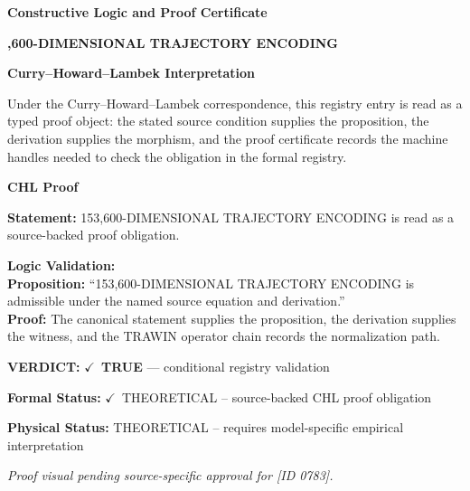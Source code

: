 \clearpage
\begingroup\tzpsupportsetup
\noindent\textbf{\fontsize{10.8pt}{12.8pt}\selectfont [ID 0783] Constructive Logic and Proof Certificate}\par
\noindent\textbf{\fontsize{10pt}{12pt},600-DIMENSIONAL TRAJECTORY ENCODING}\par
\vspace{0.45em}
\begingroup
\footnotesize
\setlength{\parskip}{0.22em}
\setlength{\parindent}{0pt}
\noindent\textbf{Curry--Howard--Lambek Interpretation}\par
Under the Curry--Howard--Lambek correspondence, this registry entry is read as a typed proof
object: the stated source condition supplies the proposition, the derivation supplies the
morphism, and the proof certificate records the machine handles needed to check the obligation
in the formal registry.

\vspace{0.45em}
\noindent\textbf{CHL Proof}\par
\textbf{Statement:} 153,600-DIMENSIONAL TRAJECTORY ENCODING is read as a source-backed proof obligation.

\textbf{Logic Validation:}\\
\textbf{Proposition:} ``153,600-DIMENSIONAL TRAJECTORY ENCODING is admissible under the named source equation and derivation.''\\
\textbf{Proof:} The canonical statement supplies the proposition, the derivation supplies the witness, and the TRAWIN operator chain records the normalization path.

\textbf{VERDICT:} \ensuremath{\checkmark}\ \textbf{TRUE} --- conditional registry validation

\textbf{Formal Status:} \ensuremath{\checkmark}\ THEORETICAL -- source-backed CHL proof obligation

\textbf{Physical Status:} THEORETICAL -- requires model-specific empirical interpretation
\par\vspace{0.45em}
\par
\vfill
\begingroup\footnotesize\itshape
Proof visual pending source-specific approval for [ID 0783].
\par\endgroup
\vfill
\endgroup
\endgroup
